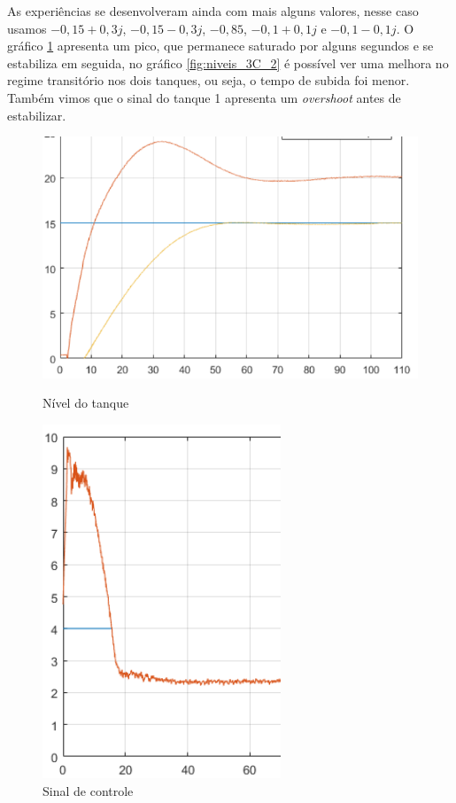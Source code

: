 \documentclass[
	12pt,				%
	openany,			%
	oneside,			%
	a4paper,			%
	english,			%
	french,				%
	spanish,			%
	brazil,				%
	]{abntex2}
\begin{document}
{As experiências se desenvolveram ainda com mais alguns valores, nesse caso usamos $-0,15+0,3j$, $-0,15-0,3j$, $-0,85$, $-0,1+0,1j$ e 
$-0,1-0,1j$. O gráfico \ref{fig:sinal_3C_2} apresenta um pico, que permanece saturado por alguns segundos e se estabiliza em seguida, no gráfico \ref{fig:niveis_3C_2} é possível ver uma melhora no regime transitório nos dois tanques, ou seja, o tempo de subida foi menor. Também vimos que o sinal do tanque 1 apresenta um \textit{overshoot} antes de estabilizar. 

\begin{figure}[h]
	\centering
	\begin{minipage}{.5\textwidth}
		\centering
		\includegraphics[scale=0.45]{imagens/3C_2_niveis.png}
		\caption{Nível do tanque}
		\label{fig:niveis_3C_2}		
	\end{minipage}%
	\begin{minipage}{.5\textwidth}
		\centering
		\includegraphics[scale=0.45]{imagens/3A_2_sinal_controle.png}
		\caption{Sinal de controle}
		\label{fig:sinal_3C_2}		
	\end{minipage}
\end{figure}

}
\end{document}
